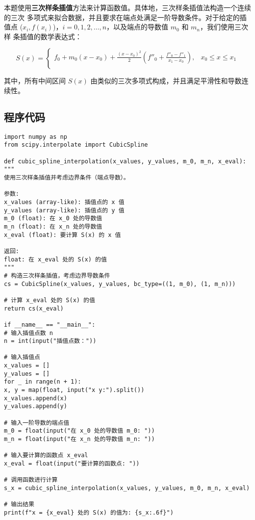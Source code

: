 \documentclass[b5paper;twoside]{article}
\begin{document}
本题使用\textbf{三次样条插值}方法来计算函数值。具体地，三次样条插值法构造一个连续的三次
多项式来拟合数据，并且要求在端点处满足一阶导数条件。对于给定的插值点 ($x_i, 
f(x_i)$)，$i = 0, 1, 2, \dots, n$，以及端点的导数值 $m_0$ 和 $m_n$，我们使用三次样
条插值的数学表达式：

\[
S(x) = 
\begin{cases} 
	f_0 + m_0 (x - x_0) + \frac{(x - x_0)^2}{2} \left( f''_0 + \frac{f''_0 - 
	f''_1}{x_1 - x_0} \right), & x_0 \leq x \leq x_1 \\
\end{cases}
\]

其中，所有中间区间 $S(x)$ 由类似的三次多项式构成，并且满足平滑性和导数连续性。

\subsection{程序代码}

\begin{lstlisting}
import numpy as np
from scipy.interpolate import CubicSpline

def cubic_spline_interpolation(x_values, y_values, m_0, m_n, x_eval):
"""
使用三次样条插值并考虑边界条件（端点导数）。

参数:
x_values (array-like): 插值点的 x 值
y_values (array-like): 插值点的 y 值
m_0 (float): 在 x_0 处的导数值
m_n (float): 在 x_n 处的导数值
x_eval (float): 要计算 S(x) 的 x 值

返回:
float: 在 x_eval 处的 S(x) 的值
"""
# 构造三次样条插值，考虑边界导数条件
cs = CubicSpline(x_values, y_values, bc_type=((1, m_0), (1, m_n)))

# 计算 x_eval 处的 S(x) 的值
return cs(x_eval)

if __name__ == "__main__":
# 输入插值点数 n
n = int(input("插值点数："))

# 输入插值点
x_values = []
y_values = []
for _ in range(n + 1):
x, y = map(float, input("x y:").split())
x_values.append(x)
y_values.append(y)

# 输入一阶导数的端点值
m_0 = float(input("在 x_0 处的导数值 m_0: "))
m_n = float(input("在 x_n 处的导数值 m_n: "))

# 输入要计算的函数点 x_eval
x_eval = float(input("要计算的函数点: "))

# 调用函数进行计算
s_x = cubic_spline_interpolation(x_values, y_values, m_0, m_n, x_eval)

# 输出结果
print(f"x = {x_eval} 处的 S(x) 的值为: {s_x:.6f}")

\end{lstlisting}
\end{document}
